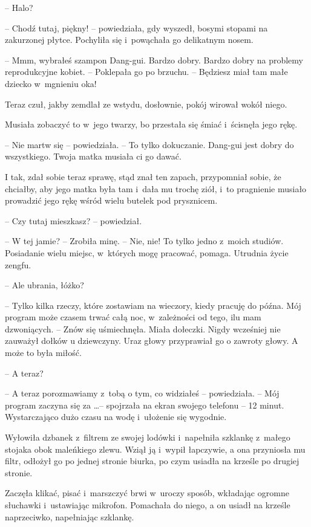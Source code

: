 \documentclass[oneside,polish,11pt,rmheadings]{mwbk}
\begin{document}
-- Halo? 

-- Chodź tutaj, piękny! -- powiedziała, gdy wyszedł, bosymi stopami na zakurzonej płytce. Pochyliła się i~powąchała go delikatnym nosem. 

-- Mmm, wybrałeś szampon Dang-gui. Bardzo dobry. Bardzo dobry na problemy reprodukcyjne kobiet. -- Poklepała go po brzuchu. -- Będziesz miał tam małe dziecko w~mgnieniu oka! 

Teraz czuł, jakby zemdlał ze wstydu, dosłownie, pokój wirował wokół niego.

Musiała zobaczyć to w~jego twarzy, bo przestała się śmiać i~ścisnęła jego rękę. 

-- Nie martw się -- powiedziała. -- To tylko dokuczanie. Dang-gui jest dobry do wszystkiego. Twoja matka musiała ci go dawać. 

I tak, zdał sobie teraz sprawę, stąd znał ten zapach, przypomniał sobie, że chciałby, aby jego matka była tam i~dała mu trochę ziół, i~to pragnienie musiało prowadzić jego rękę wśród wielu butelek pod prysznicem.

-- Czy tutaj mieszkasz? -- powiedział.

-- W tej jamie? -- Zrobiła minę. -- Nie, nie! To tylko jedno z~moich studiów. Posiadanie wielu miejsc, w~których mogę pracować, pomaga. Utrudnia życie zengfu.

-- Ale ubrania, łóżko?

-- Tylko kilka rzeczy, które zostawiam na wieczory, kiedy pracuję do późna. Mój program może czasem trwać całą noc, w~zależności od tego, ilu mam dzwoniących. -- Znów się uśmiechnęła. Miała dołeczki. Nigdy wcześniej nie zauważył dołków u dziewczyny. Uraz głowy przyprawiał go o zawroty głowy. A może to była miłość.

-- A teraz? 

-- A teraz porozmawiamy z~tobą o tym, co widziałeś -- powiedziała. -- Mój program zaczyna się za \ldots  -- spojrzała na ekran swojego telefonu -- 12 minut. Wystarczająco dużo czasu na wodę i~ułożenie się wygodnie. 

Wyłowiła dzbanek z~filtrem ze swojej lodówki i~napełniła szklankę z~małego stojaka obok maleńkiego zlewu. Wziął ją i~wypił łapczywie, a ona przyniosła mu filtr, odłożył go po jednej stronie biurka, po czym usiadła na krześle po drugiej stronie.

Zaczęła klikać, pisać i~marszczyć brwi w~uroczy sposób, wkładając ogromne słuchawki i~ustawiając mikrofon. Pomachała do niego, a on usiadł na krześle naprzeciwko, napełniając szklankę.
\end{document}
